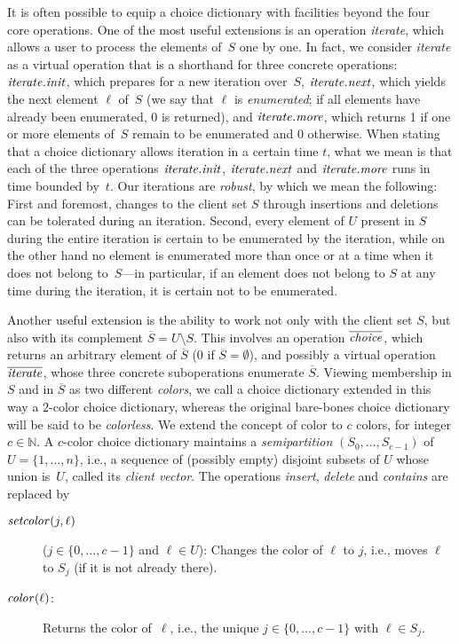 \documentclass[envcountsame,envcountsect,undated,nolinenumbers]{lnthi}
\def\Tvn#1{\hbox{\textit{#1\/}}}
\def\TbbbN{\mathbb{N}}
\def\citerate{\overline{\Tvn{iterate}}}
\begin{document}
It is often possible to equip a choice dictionary
with facilities beyond the four core operations.
One of the most useful extensions is an operation
\Tvn{iterate}, which allows a user to process
the elements of~$S$ one by one.
In fact, we consider \Tvn{iterate} as a virtual
operation that is a shorthand for three concrete operations:
$\Tvn{iterate}.\Tvn{init}$, which prepares
for a new iteration over~$S$,
$\Tvn{iterate}.\Tvn{next}$, which
yields the next element $\ell$ of~$S$
(we say that $\ell$ is \emph{enumerated};
if all elements have already been enumerated,
0 is returned), and
$\Tvn{iterate}.\Tvn{more}$, which returns 1 if
one or more elements of~$S$ remain to be enumerated
and 0 otherwise.
When stating that a choice dictionary allows
iteration in a certain time $t$, what we mean
is that each of the three operations
$\Tvn{iterate}.\Tvn{init}$,
$\Tvn{iterate}.\Tvn{next}$ and
$\Tvn{iterate}.\Tvn{more}$
runs in time bounded by~$t$.
Our iterations are \emph{robust}, by
which we mean the following:
First and foremost, changes to the
client set $S$ through insertions
and deletions can be tolerated during an iteration.
Second, every element of $U$ present in $S$ during
the entire iteration is certain to be enumerated
by the iteration, while on the other hand no
element is enumerated more than once or at a time when it
does not belong to~$S$---in particular, if an element
does not belong to $S$ at any time during the
iteration, it is certain not to be enumerated.

Another useful extension is the ability to work
not only with the client set $S$, but also with
its complement $\overline{S}=U\setminus S$.
This involves an operation
$\cchoice$, which returns an arbitrary element
of $\overline{S}$ (0 if $\overline{S}=\emptyset$),
and possibly a virtual operation $\citerate$,
whose three concrete suboperations enumerate
$\overline{S}$.
Viewing membership in $S$ and in $\overline{S}$
as two different \emph{colors}, we call a choice
dictionary extended in this way a $2$-color choice dictionary,
whereas the original bare-bones choice dictionary
will be said to be \emph{colorless}.
We extend the concept of color
to $c$ colors, for integer $c\in\TbbbN$.
A $c$-color choice dictionary maintains a
\emph{semipartition} $(S_0,\ldots,S_{c-1})$
of $U=\{1,\ldots,n\}$, i.e.,
a sequence of (possibly empty)
disjoint subsets of $U$ whose union is~$U$,
called its \emph{client vector}.
The operations \Tvn{insert}, \Tvn{delete}
and \Tvn{contains} are replaced by

\begin{description}
\item[\normalfont$\Tvn{setcolor}(j,\ell)$]
($j\in\{0,\ldots,c-1\}$ and $\ell\in U$):
Changes the color of $\ell$ to $j$, i.e.,
moves $\ell$ to $S_j$ (if it is not already there).
\item[\normalfont$\Tvn{color}(\ell)$:]
Returns the color of~$\ell$, i.e.,
the unique $j\in\{0,\ldots,c-1\}$ with $\ell\in S_j$.
\end{description}
\end{document}
